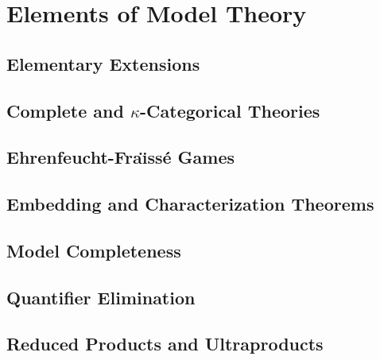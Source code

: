 \vfill\break

\section{Elements of Model Theory}

\subsection{Elementary Extensions}



\subsection{Complete and $\kappa$-Categorical Theories}



\subsection{Ehrenfeucht-Fra\"\i ss\'e Games}



\subsection{Embedding and Characterization Theorems}



\subsection{Model Completeness}



\subsection{Quantifier Elimination}



\subsection{Reduced Products and Ultraproducts}

